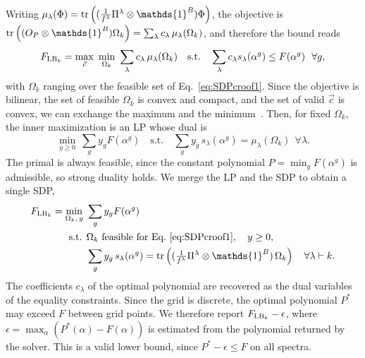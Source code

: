 \documentclass[11pt,a4paper]{report}
\newcommand{\one}{\mathds{1}}
\newcommand{\I}{\one}
\renewcommand{\a}{\alpha}
\newcounter{reptag}
\newif\iftags \tagsfalse   %
\newcommand{\reptagbox}[3]{\iftags\par\smallskip\noindent\refstepcounter{reptag}%
  \fcolorbox{#1}{#1!7}{\parbox{\dimexpr\linewidth-2\fboxsep-2\fboxrule\relax}{\small
  \textcolor{#1}{\textbf{[\thereptag]\ #2.}}\ #3}}\par\smallskip\fi}
\newcommand{\detail}[1]{\reptagbox{tagD}{More detail}{#1}}
\begin{document}
Writing $\mu_\lambda(\Phi)=\tr\left((\tfrac{1}{f^\lambda}\Pi^\lambda\otimes\I^B)\Phi\right)$, the objective is $\tr\left((O_P\otimes\I^B)\Omega_k\right)=\sum_\lambda c_\lambda\,\mu_\lambda(\Omega_k)$, and therefore the bound reads
\begin{equation}
    F_{{\rm LB}_k}=\max_{\vec c}\ \min_{\Omega_k}\ \sum_\lambda c_\lambda\,\mu_\lambda(\Omega_k)
    \quad\text{s.t.}\quad \sum_\lambda c_\lambda s_\lambda(\a^g)\leq F(\a^g)\ \ \forall g,
\end{equation}
with $\Omega_k$ ranging over the feasible set of Eq.~\eqref{eq:SDPcroof1}. Since the objective is bilinear, the set of feasible $\Omega_k$ is convex and compact, and the set of valid $\vec{c}$ is convex, we can exchange the maximum and the minimum~\cite{Sion1958}. Then, for fixed $\Omega_k$, the inner maximization is an LP whose dual is
\begin{equation}
    \min_{y\geq0}\ \sum_g y_g F(\a^g)\quad\text{s.t.}\quad \sum_g y_g\,s_\lambda(\a^g)=\mu_\lambda(\Omega_k)\ \ \forall\lambda .
\end{equation}
The primal is always feasible, since the constant polynomial $P=\min_g F(\a^g)$ is admissible, so strong duality holds. We merge the LP and the SDP to obtain a single SDP,
\begin{align}
    F_{{\rm LB}_k}=\min_{\Omega_k,\,y}\ & \sum_g y_g F(\a^g)\\
    \text{s.t. }& \Omega_k\ \text{feasible for Eq.~\eqref{eq:SDPcroof1}},\quad y\geq0, \nonumber\\
    & \sum_g y_g\,s_\lambda(\a^g)=\tr\left((\tfrac{1}{f^\lambda}\Pi^\lambda\otimes\I^B)\,\Omega_k\right)\quad\forall\lambda\vdash k. \nonumber
\end{align}
The coefficients $c_\lambda$ of the optimal polynomial are recovered as the dual variables of the equality constraints. Since the grid is discrete, the optimal polynomial $P^*$ may exceed $F$ between grid points. We therefore report $F_{{\rm LB}_k}-\epsilon$, where $\epsilon=\max_\a\left(P^*(\a)-F(\a)\right)$ is estimated from the polynomial returned by the solver. This is a valid lower bound, since $P^*-\epsilon\leq F$ on all spectra.
\detail{State Sion's minimax theorem with its hypotheses. The work on which polynomial class to optimise over fits here: the three classes (A: $g\ge0$ with exact zeros, B: zeros only, C: only $g\le f$), with the Werner-state example where C is exact (0.142929 at degree 2) and A gives 0.1225, and C converging in 3--12 cutting-plane rounds against about 50 for A and B. Also the comparison with the Taylor cubic and the Schur-sampling estimator $\sum_\lambda f(\lambda/k)\Pi^\lambda$.}
\end{document}
